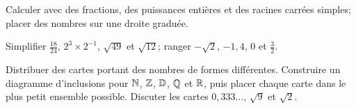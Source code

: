 \begin{prerequis}
Calculer avec des fractions, des puissances entières et des racines carrées
simples; placer des nombres sur une droite graduée.
\end{prerequis}
\begin{automatismes}
Simplifier $\frac{18}{24}$, $2^3\times2^{-1}$, $\sqrt{49}$ et
$\sqrt{12}$; ranger $-\sqrt2$, $-1{,}4$, $0$ et $\frac32$.
\end{automatismes}
\begin{activite}
Distribuer des cartes portant des nombres de formes différentes. Construire un
diagramme d'inclusions pour $\mathbb{N}$, $\mathbb{Z}$, $\mathbb{D}$, $\mathbb{Q}$ et $\mathbb{R}$, puis placer chaque
carte dans le plus petit ensemble possible. Discuter les cartes $0{,}333\ldots$,
$\sqrt{9}$ et $\sqrt2$.
\end{activite}

